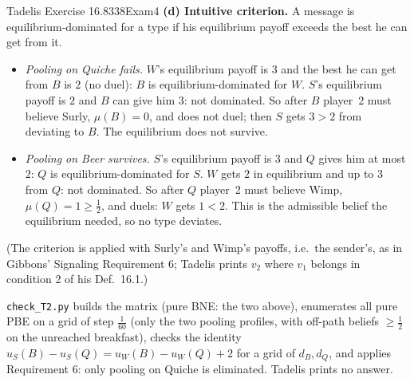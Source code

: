 \begin{exsol}{Tadelis Exercise 16.8}{338}{Exam}{4}
\textbf{(d) Intuitive criterion.} A message is equilibrium-dominated for a type if his equilibrium payoff
exceeds the best he can get from it.
\begin{itemize}
  \item \emph{Pooling on Quiche fails.} $W$'s equilibrium payoff is $3$ and the best he can get from $B$ is
  $2$ (no duel): $B$ is equilibrium-dominated for $W$. $S$'s equilibrium payoff is $2$ and $B$ can give
  him $3$: not dominated. So after $B$ player~2 must believe Surly, $\mu(B) = 0$, and does not duel; then $S$
  gets $3 > 2$ from deviating to $B$. The equilibrium does not survive.
  \item \emph{Pooling on Beer survives.} $S$'s equilibrium payoff is $3$ and $Q$ gives him at most $2$:
  $Q$ is equilibrium-dominated for $S$. $W$ gets $2$ in equilibrium and up to $3$ from $Q$: not dominated.
  So after $Q$ player~2 must believe Wimp, $\mu(Q) = 1 \ge \frac12$, and duels: $W$ gets $1 < 2$. This is the
  admissible belief the equilibrium needed, so no type deviates.
\end{itemize}
(The criterion is applied with Surly's and Wimp's payoffs, i.e.\ the sender's, as in Gibbons'
Signaling Requirement 6; Tadelis prints $v_2$ where $v_1$ belongs in condition 2 of his Def.~16.1.)

\verify \texttt{check\_T2.py} builds the matrix (pure BNE: the two above), enumerates all pure PBE on a
grid of step $\frac1{60}$ (only the two pooling profiles, with off-path beliefs $\ge \frac12$ on the unreached
breakfast), checks the identity $u_S(B) - u_S(Q) = u_W(B) - u_W(Q) + 2$ for a grid of $d_B, d_Q$, and applies
Requirement 6: only pooling on Quiche is eliminated. Tadelis prints no answer.

\end{exsol}
